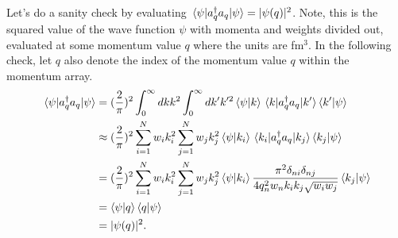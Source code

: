 \documentclass[preprintnumbers,floatfix,aps,prc,preprint,nofootinbib]{revtex4-1}
\begin{document}
Let's do a sanity check by evaluating $\mel{\psi}{a^{\dagger}_q a_q}{\psi}=|\psi(q)|^2$. Note, this is the squared value of the wave function $\psi$ with momenta and weights divided out, evaluated at some momentum value $q$ where the units are fm$^3$.
In the following check, let $q$ also denote the index of the momentum value $q$ within the momentum array.
%
\begin{align}
    \label{eq:momentum_proj_check}
    \mel{\psi}{a^{\dagger}_q a_q}{\psi} &= (\frac{2}{\pi})^2 \int_0^{\infty} dk k^2 \int_0^{\infty} dk' k'^2 \bra{\psi} \ket{k} \mel{k}{a^{\dagger}_q a_q}{k'} \bra{k'} \ket{\psi} \nonumber \\
    &\approx (\frac{2}{\pi})^2 \sum_{i=1}^{N} w_i k_i^2 \sum_{j=1}^{N} w_j k_j^2 \bra{\psi} \ket{k_i} \mel{k_i}{a^{\dagger}_{q} a_{q}}{k_j} \bra{k_j} \ket{\psi} \nonumber \\
    &= (\frac{2}{\pi})^2 \sum_{i=1}^{N} w_i k_i^2 \sum_{j=1}^{N} w_j k_j^2 \bra{\psi} \ket{k_i} \frac{\pi^2 \delta_{ni} \delta_{nj}}{4 q_n^2 w_n k_i k_j \sqrt{w_i w_j}} \bra{k_j} \ket{\psi} \nonumber \\
    &= \bra{\psi} \ket{q} \bra{q} \ket{\psi} \nonumber \\
    &= |\psi(q)|^2.
\end{align}
%

\end{document}
